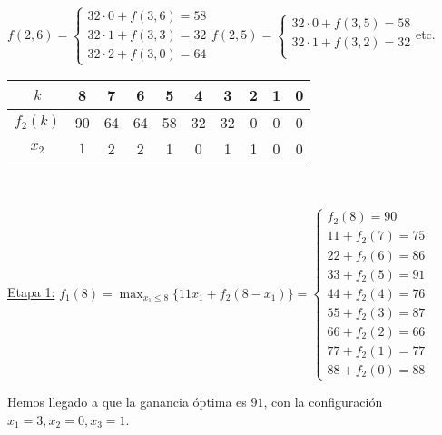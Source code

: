 \documentclass[twoside]{article}
\begin{document}
\begin{ejercicio}{2}
\begin{solucion}
$f(2,6)=\begin{cases}
32\cdot 0+f(3,6)=58\\
32\cdot 1+f(3,3)=32\\
32\cdot 2+f(3,0)=64
\end{cases}$\quad $f(2,5)=\begin{cases}
32\cdot 0+f(3,5)=58\\
32\cdot 1+f(3,2)=32\\
\end{cases}$\quad etc.

\begin{tabular}{c| c c c c c c c c c}
$k$ & 8 & 7 & 6 & 5 & 4 & 3 & 2 & 1 & 0\\
\hline
$f_2(k)$ & 90 & 64 & 64 & 58 & 32 & 32 & 0 & 0 & 0\\
$x_2$ &  $1$ & 2 & 2 &    1&  0 & 1 &   1 & 0 & 0
\end{tabular}\

\underline{Etapa 1:}
$f_1(8)=\max_{x_1\leq 8}\{11x_1+f_2(8-x_1)\}=\begin{cases}
f_2(8)=90\\
11+f_2(7)=75\\
22+f_2(6)=86\\
33+f_2(5)=\boxed{91}\\
44+f_2(4)=76\\
55+f_2(3)=87\\
66+f_2(2)=66\\
77+f_2(1)=77\\
88+f_2(0)=88
\end{cases}$

Hemos llegado a que la ganancia óptima es $91$, con la configuración $x_1=3,x_2=0, x_3=1$.
\end{solucion}

\end{ejercicio}
\end{document}
